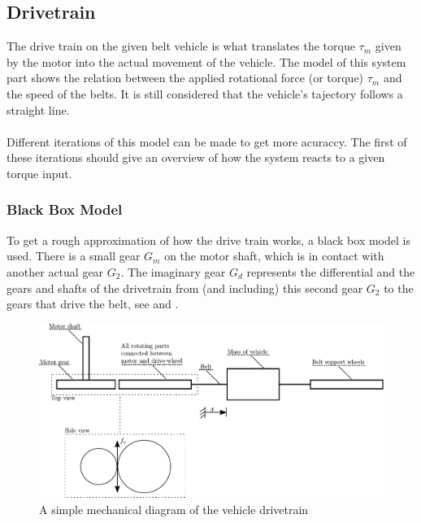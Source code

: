 \subsection{Drivetrain}\label{Drivetrain}

The drive train on the given belt vehicle is what translates the torque $\tau_m$ given by the motor into the actual movement of the vehicle. The model of this system part shows the relation between the applied rotational force (or torque) $\tau_m$ and the speed of the belts. It is still considered that the vehicle's tajectory follows a straight line.\\\\
%
Different iterations of this model can be made to get more acuraccy. The first of these iterations should give an overview of how the system reacts to a given torque input. 

\subsubsection{Black Box Model}\label{BlackBoxModel}
To get a rough approximation of how the drive train works, a black box model is used. There is a small gear $G_m$ on the motor shaft, which is in contact with another actual gear $G_2$. The imaginary gear $G_d$ represents the differential and the gears and shafts of the drivetrain from (and including) this second gear $G_2$ to the gears that drive the belt, see  and .

\begin{figure}[H]
	\centering
	\includegraphics[scale=0.8]{figures/mechanicalDrawing.pdf}
	\caption{A simple mechanical diagram of the vehicle drivetrain}
	\label{fig:DrivetrainMechanicalModel}
\end{figure}

